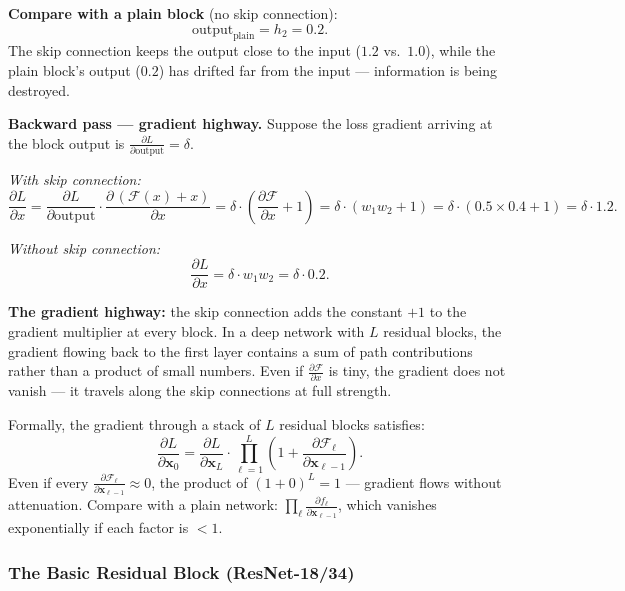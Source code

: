 \documentclass[11pt,a4paper]{article}
\begin{document}
\textbf{Compare with a plain block} (no skip connection):
\[
  \text{output}_\text{plain} = h_2 = 0.2.
\]
The skip connection keeps the output close to the input ($1.2$ vs.\ $1.0$), while the plain
block's output ($0.2$) has drifted far from the input — information is being destroyed.

\textbf{Backward pass — gradient highway.}
Suppose the loss gradient arriving at the block output is $\frac{\partial L}{\partial \text{output}} = \delta$.

\emph{With skip connection:}
\[
  \frac{\partial L}{\partial x}
  = \frac{\partial L}{\partial \text{output}} \cdot
    \frac{\partial\,(\mathcal{F}(x) + x)}{\partial x}
  = \delta \cdot \left(\frac{\partial \mathcal{F}}{\partial x} + 1\right)
  = \delta \cdot (w_1 w_2 + 1)
  = \delta \cdot (0.5 \times 0.4 + 1)
  = \delta \cdot 1.2.
\]

\emph{Without skip connection:}
\[
  \frac{\partial L}{\partial x}
  = \delta \cdot w_1 w_2
  = \delta \cdot 0.2.
\]

\begin{tcolorbox}[colback=LightBlue,colframe=AccentBlue,boxrule=0.8pt,arc=3pt]
\textbf{The gradient highway:} the skip connection adds the constant $+1$ to the gradient
multiplier at every block.  In a deep network with $L$ residual blocks, the gradient flowing
back to the first layer contains a sum of path contributions rather than a product of small
numbers.  Even if $\frac{\partial \mathcal{F}}{\partial x}$ is tiny, the gradient does not
vanish — it travels along the skip connections at full strength.

Formally, the gradient through a stack of $L$ residual blocks satisfies:
\[
  \frac{\partial L}{\partial \mathbf{x}_0}
  = \frac{\partial L}{\partial \mathbf{x}_L}
    \cdot \prod_{\ell=1}^{L}\!\left(1 + \frac{\partial \mathcal{F}_\ell}{\partial \mathbf{x}_{\ell-1}}\right).
\]
Even if every $\frac{\partial \mathcal{F}_\ell}{\partial \mathbf{x}_{\ell-1}} \approx 0$,
the product of $(1 + 0)^L = 1$ — gradient flows without attenuation.
Compare with a plain network: $\prod_\ell \frac{\partial f_\ell}{\partial \mathbf{x}_{\ell-1}}$,
which vanishes exponentially if each factor is $< 1$.
\end{tcolorbox}

\subsubsection{The Basic Residual Block (ResNet-18/34)}
\end{document}

